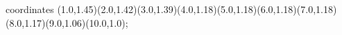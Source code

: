 					coordinates { (1.0,1.45)(2.0,1.42)(3.0,1.39)(4.0,1.18)(5.0,1.18)(6.0,1.18)(7.0,1.18)(8.0,1.17)(9.0,1.06)(10.0,1.0)};